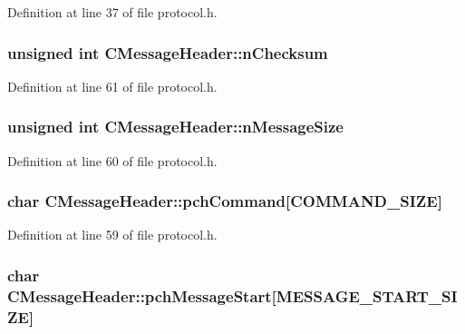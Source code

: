 Definition at line 37 of file protocol.\+h.

\hypertarget{class_c_message_header_ab9c6bec3694e2c110b4f358af9e55984}{}
\subsubsection[{n\+Checksum}]{\setlength{\rightskip}{0pt plus 5cm}unsigned int C\+Message\+Header\+::n\+Checksum}\label{class_c_message_header_ab9c6bec3694e2c110b4f358af9e55984}


Definition at line 61 of file protocol.\+h.

\hypertarget{class_c_message_header_a67ccb9f1f23af69e309a8d6c8bfff751}{}
\subsubsection[{n\+Message\+Size}]{\setlength{\rightskip}{0pt plus 5cm}unsigned int C\+Message\+Header\+::n\+Message\+Size}\label{class_c_message_header_a67ccb9f1f23af69e309a8d6c8bfff751}


Definition at line 60 of file protocol.\+h.

\hypertarget{class_c_message_header_a87d62b0d9afb3889f318991700a34431}{}
\subsubsection[{pch\+Command}]{\setlength{\rightskip}{0pt plus 5cm}char C\+Message\+Header\+::pch\+Command\mbox{[}{\bf C\+O\+M\+M\+A\+N\+D\+\_\+\+S\+I\+Z\+E}\mbox{]}}\label{class_c_message_header_a87d62b0d9afb3889f318991700a34431}


Definition at line 59 of file protocol.\+h.

\hypertarget{class_c_message_header_a4284bf1d2fd792af89e1c93b7e6e274e}{}
\subsubsection[{pch\+Message\+Start}]{\setlength{\rightskip}{0pt plus 5cm}char C\+Message\+Header\+::pch\+Message\+Start\mbox{[}{\bf M\+E\+S\+S\+A\+G\+E\+\_\+\+S\+T\+A\+R\+T\+\_\+\+S\+I\+Z\+E}\mbox{]}}\label{class_c_message_header_a4284bf1d2fd792af89e1c93b7e6e274e}


